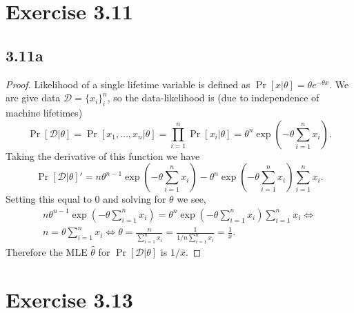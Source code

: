 \documentclass[12pt]{article}
\newcommand{\D}{\mathcal{D}}
\begin{document}
\section*{Exercise 3.11}
\subsection*{3.11a}
\begin{proof}
Likelihood of a single lifetime variable is defined as $\Pr[x | \theta] = \theta e^{-\theta x}.$
We are give data $\D = \{x_i\}_i^n$, so the data-likelihood is (due to
independence of machine lifetimes)
\[\Pr[\D|\theta] = \Pr[x_1, \dotsc, x_n|\theta] = \prod_{i=1}^n \Pr[x_i | \theta] =
    \theta^n \exp(-\theta \sum_{i=1}^n x_i).\]
Taking the derivative of this function we have
\[\Pr[\D|\theta]' = n \theta^{n - 1}\exp(-\theta \sum_{i=1}^n x_i)
    - \theta^n \exp(-\theta \sum_{i=1}^n x_i) \sum_{i=1}^n x_i.\]
Setting this equal to 0 and solving for $\theta$ we see,
\begin{align*}
    n \theta^{n - 1}\exp(-\theta \sum_{i=1}^n x_i) = 
        \theta^n \exp(-\theta \sum_{i=1}^n x_i) \sum_{i=1}^n x_i \iff\\
    n = \theta \sum_{i=1}^n x_i \iff \theta =
        \frac{n}{\sum_{i=1}^n x_i} = \frac{1}{1/n \sum_{i=1}^n x_i} = \frac{1}{\bar{x}}.
\end{align*}
Therefore the MLE $\hat{\theta}$ for $\Pr[\D|\theta]$ is $1/\bar{x}.$
\end{proof}
\section*{Exercise 3.13}
\end{document}
